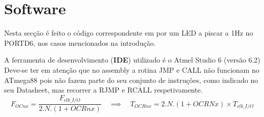 \documentclass[titlepage, a4paper, 10pt, reqno, openany]{report}
\begin{document}

	\section{Software}
	Nesta sec\c{c}\~{a}o \'{e} feito o c\'{o}digo correspondente em por um LED a piscar a 1Hz no PORTD6, nos casos mencionados na introdu\c{c}\~{a}o. \par
	A ferramenta de desenvolvimento ({\bf IDE}) utilizado \'{e} o Atmel Studio 6 (vers\~{a}o 6.2) \\
	Deve-se ter em aten\c{c}\~{a}o que no assembly a rotina JMP e CALL n\~{a}o funcionam no ATmega88 pois n\~{a}o fazem parte do seu conjunto de instru\c{c}\~{o}es, como indicado no seu Datasheet, mas recorrer a RJMP e RCALL respetivamente.	
	\begin{equation}
\boxed{F_{OCnx}=\frac{F_{clk\_I/O}}{2.N.(1+{OCRnx})}} \quad
\implies \quad {T_{OCRnx}=2.N.(1+OCRNx)\times T_{clk\_I/O}}
	\end{equation}
\end{document}
